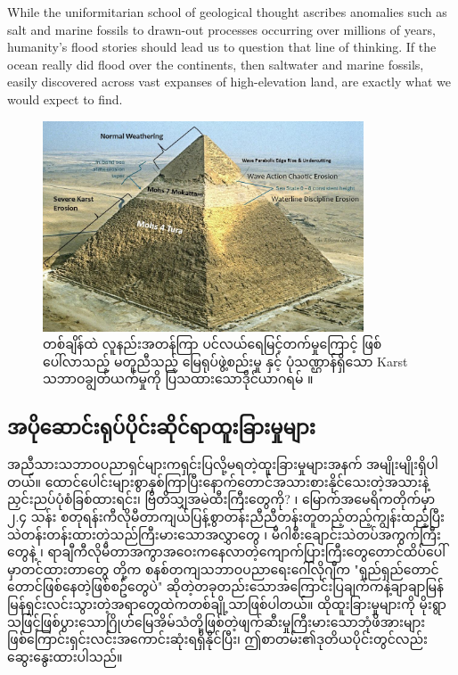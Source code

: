 \documentclass[10pt,twocolumn,letterpaper]{article}
\begin{document}
While the uniformitarian school of geological thought ascribes anomalies such as salt and marine fossils to drawn-out processes occurring over millions of years, humanity's flood stories should lead us to question that line of thinking. If the ocean really did flood over the continents, then saltwater and marine fossils, easily discovered across vast expanses of high-elevation land, are exactly what we would expect to find.

\begin{figure}[t]
\begin{center}
\includegraphics[width=0.85\textwidth]{khafre.jpg}
\end{center}
   \caption{တစ်ချိန်ထဲ လူနည်းအတန်ကြာ ပင်လယ်ရေမြင့်တက်မှုကြောင့် ဖြစ်ပေါ်လာသည့် မတူညီသည့် မြေရုပ်ဖွဲ့စည်းမှု နှင့် ပုံသဏ္ဌာန်ရှိသော Karst သဘာဝချွတ်ယက်မှုကို ပြသထားသောဒိုင်ယာဂရမ် \cite{27}။}
\label{fig:4}

\end{figure}

\subsection{အပိုဆောင်းရုပ်ပိုင်းဆိုင်ရာထူးခြားမှုများ}

အညီသားသဘာဝပညာရှင်များကရှင်းပြလို့မရတဲ့ထူးခြားမှုများအနက် အမျိုးမျိုးရှိပါတယ်။ ထောင်ပေါင်းများစွာနှစ်ကြာပြီးနောက်တောင်အသားစားနိုင်သေးတဲ့အသားနဲ့ညှင်းညပ်ပုံစံခြစ်ထားရင်း၊ ဗြိတိသျှအမဲထီးကြီးတွေကို? \cite{17,18,19} ၊ မြောက်အမေရိကတိုက်မှာ ၂.၄ သန်း စတုရန်းကီလိုမီတာကျယ်ပြန့်စွာတန်းညီညီတန်းတူတည့်တည့်ကျွန်းထည့်ပြီးသဲတန်းတန်းထားတဲ့သည်ကြီးမားသောအလွှာတွေ \cite{21} ၊ မီဂါစီးချောင်းသဲတပ်အကွက်ကြီးတွေနဲ့ \cite{22} ၊ ရာချီကီလိုမီတာအကွာအဝေးကနေလာတဲ့ကျောက်ပြားကြီးတွေတောင်ထိပ်ပေါ်မှာတင်ထားတာတွေ \cite{23,26} တို့က စနစ်တကျသဘာဝပညာရေးဂေါ်လိုဂျီက "ရှည်ရှည်တောင်တောင်ဖြစ်နေတဲ့ဖြစ်စဥ်တွေပဲ" ဆိုတဲ့တခုတည်းသောအကြောင်းပြချက်ကနဲ့ချာချာမြန်မြန်ရှင်းလင်းသွားတဲ့အရာတွေထဲကတစ်ချို့သာဖြစ်ပါတယ်။ ထိုထူးခြားမှုများကို မိုးရွာသဖြင့်ဖြစ်ပွားသောဂြိုဟ်မြေအိမ်သံတို့ဖြစ်တဲ့ဖျက်ဆီးမှုကြီးမားသောဘုံဖိအားများဖြစ်ကြောင်းရှင်းလင်းအကောင်းဆုံးရရှိနိုင်ပြီး၊ ဤစာတမ်း၏ဒုတိယပိုင်းတွင်လည်းဆွေးနွေးထားပါသည်။
\end{document}
